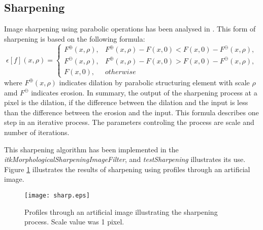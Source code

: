 \documentclass{InsightArticle}
\begin{document}
\subsection{Sharpening}
Image sharpening using parabolic operations has been analysed in
\cite{Schavemaker2000}. This form of sharpening is based on the following formula:
\begin{equation}
\epsilon[f](x, \rho) =
\begin{cases}
F^\oplus(x,\rho), &F^\oplus(x,\rho) - F(x,0) < F(x,0) - F^\ominus(x,\rho),\\
F^\ominus(x,\rho), &F^\oplus(x,\rho) - F(x,0) > F(x,0) - F^\ominus(x,\rho),\\
F(x,0), &otherwise
\end{cases}
\end{equation}
where $F^\oplus(x,\rho)$ indicates dilation by parabolic structuring
element with scale $\rho$ amd $F^\ominus$ indicates erosion. In
summary, the output of the sharpening process at a pixel is the
dilation, if the difference between the dilation and the input is less
than the difference between the erosion and the input. This formula
describes one step in an iterative process. The parameters controling
the process are scale and number of iterations.

This sharpening algorithm has been implemented in the {\em
  itkMorphologicalSharpeningImageFilter}, and {\em testSharpening}
illustrates its use. Figure \ref{fig:sharpprofs} illustrates the
results of sharpening using profiles through an artificial image.

\begin{figure}[htbp]
\centering
\texttt{[image: sharp.eps]}
\caption{Profiles through an artificial image illustrating the sharpening process. Scale value was 1 pixel.\label{fig:sharpprofs}}
\end{figure}
\end{document}
